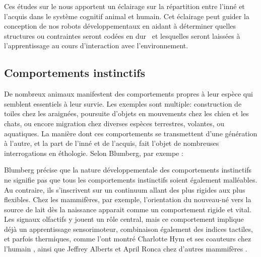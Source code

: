 Ces études sur le  nous apportent un éclairage sur la répartition entre l'inné et l'acquis dans le système cognitif animal et humain. 
Cet éclairage peut guider la conception de nos robots développementaux en aidant à déterminer quelles structures ou contraintes seront  \og codées en dur \fg\ et lesquelles seront laissées à l'apprentissage au cours d'interaction avec l'environnement. 


\subsection{Comportements instinctifs}

\noindent
De nombreux animaux manifestent des comportements propres à leur espèce qui semblent essentiels à leur survie. 
Les exemples sont multiple: construction de toiles chez les araignées, poursuite d'objets en mouvements chez les chien et les chats, ou encore migration chez diverses espèces terrestres, volantes, ou aquatiques. 
La manière dont ces comportements se transmettent d'une génération à l'autre, et la part de l'inné et de l'acquis, fait l'objet de nombreuses interrogations en éthologie. 
Selon Blumberg, par exempe : 


\begin{quote}
	\cite[p.~1]{blumberg_development_2017}	
\end{quote}

Blumberg précise que la nature développementale des comportements instinctifs ne signifie pas que tous les comportements instinctifs soient également malléables. 
Au contraire, ils s'inscrivent sur un continuum allant des plus rigides aux plus flexibles. 
Chez les mammifères, par exemple, l'orientation du nouveau-né vers la source de lait dès la naissance apparait comme un comportement rigide et vital. 
Les signaux olfactifs y jouent un rôle central, mais ce comportement implique déjà un apprentissage sensorimoteur, combinaison également des indices tactiles, et parfois thermiques, comme l'ont montré Charlotte Hym et ses coauteurs chez l'humain  \cite{hym_newborn_2021}, ainsi que Jeffrey Alberts et April Ronca chez d'autres mammifères \cite{alberts_experience_2012}. 

